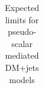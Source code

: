 \begin{table}
\begin{tabular}{rrcccc}
\hline\hline
  \end{tabular}
  \caption{Expected limits for pseudo-scalar mediated DM+jets models}
  \label{tab:DMPS_exp}
\end{table}












